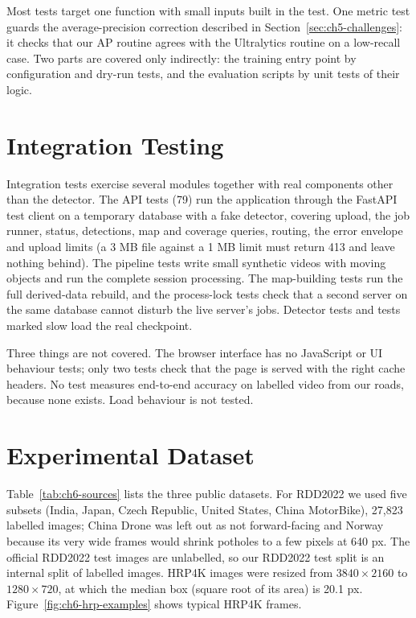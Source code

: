 Most tests target one function with small inputs built in the test. One metric test guards the average-precision correction described in Section~\ref{sec:ch5-challenges}: it checks that our AP routine agrees with the Ultralytics routine on a low-recall case. Two parts are covered only indirectly: the training entry point by configuration and dry-run tests, and the evaluation scripts by unit tests of their logic.

\section{Integration Testing}
Integration tests exercise several modules together with real components other than the detector. The API tests (79) run the application through the FastAPI test client on a temporary database with a fake detector, covering upload, the job runner, status, detections, map and coverage queries, routing, the error envelope and upload limits (a 3 MB file against a 1 MB limit must return 413 and leave nothing behind). The pipeline tests write small synthetic videos with moving objects and run the complete session processing. The map-building tests run the full derived-data rebuild, and the process-lock tests check that a second server on the same database cannot disturb the live server's jobs. Detector tests and tests marked slow load the real checkpoint.

Three things are not covered. The browser interface has no JavaScript or UI behaviour tests; only two tests check that the page is served with the right cache headers. No test measures end-to-end accuracy on labelled video from our roads, because none exists. Load behaviour is not tested.

\section{Experimental Dataset}\label{sec:ch6-data}
Table~\ref{tab:ch6-sources} lists the three public datasets. For RDD2022 we used five subsets (India, Japan, Czech Republic, United States, China MotorBike), 27,823 labelled images; China Drone was left out as not forward-facing and Norway because its very wide frames would shrink potholes to a few pixels at 640 px. The official RDD2022 test images are unlabelled, so our RDD2022 test split is an internal split of labelled images. HRP4K images were resized from $3840\times2160$ to $1280\times720$, at which the median box (square root of its area) is 20.1 px. Figure~\ref{fig:ch6-hrp-examples} shows typical HRP4K frames.

